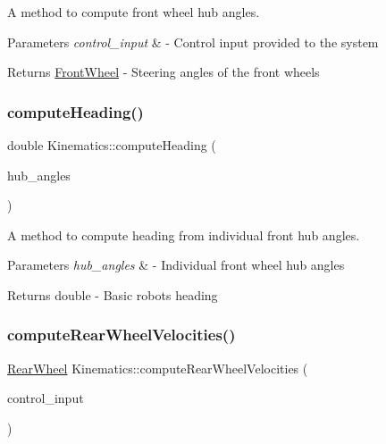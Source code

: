 A method to compute front wheel hub angles. 


\begin{DoxyParams}{Parameters}
{\em control\+\_\+input} & -\/ Control input provided to the system \\
\hline
\end{DoxyParams}
\begin{DoxyReturn}{Returns}
\hyperlink{structFrontWheel}{Front\+Wheel} -\/ Steering angles of the front wheels 
\end{DoxyReturn}
\mbox{\label{classKinematics_a333f2e56be9d8eda2ff9ed4217dac860}} 
\subsubsection{\texorpdfstring{compute\+Heading()}{computeHeading()}}
{\footnotesize\ttfamily double Kinematics\+::compute\+Heading (\begin{DoxyParamCaption}\item[{const std\+::vector$<$ double $>$ \&}]{hub\+\_\+angles }\end{DoxyParamCaption})}



A method to compute heading from individual front hub angles. 


\begin{DoxyParams}{Parameters}
{\em hub\+\_\+angles} & -\/ Individual front wheel hub angles \\
\hline
\end{DoxyParams}
\begin{DoxyReturn}{Returns}
double -\/ Basic robot\textquotesingle{}s heading 
\end{DoxyReturn}
\mbox{\label{classKinematics_ac2733720e49bcd20662e74ea9334a878}} 
\subsubsection{\texorpdfstring{compute\+Rear\+Wheel\+Velocities()}{computeRearWheelVelocities()}}
{\footnotesize\ttfamily \hyperlink{structRearWheel}{Rear\+Wheel} Kinematics\+::compute\+Rear\+Wheel\+Velocities (\begin{DoxyParamCaption}\item[{const ackermann\+\_\+msgs\+::\+Ackermann\+Drive\+Stamped \&}]{control\+\_\+input }\end{DoxyParamCaption})}



